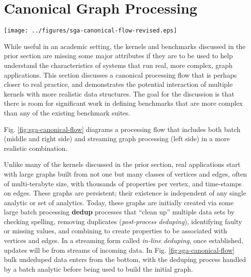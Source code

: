 \section{Canonical Graph Processing}\label{sec:sga-canonical}

\begin{figure*}\begin{centering}
\texttt{[image: ../figures/sga-canonical-flow-revised.eps]}
\caption{A Canonical Graph Processing Flow.}
\label{fig:sga-canonical-flow}
\end{centering}\end{figure*}

While useful in an academic setting, the kernels and benchmarks discussed in the prior section are missing some major attributes if they are to be used to help understand the characteristics of systems that run real, more complex, graph applications. This section discusses a canonical processing flow that is perhaps closer to real practice, and demonstrates the potential interaction of multiple kernels with more realistic data structures. The goal for the discussion is that there is room for significant work in defining benchmarks that are more complex than any of the existing benchmark suites.

Fig. \ref{fig:sga-canonical-flow} diagrams a processing flow that includes both batch (middle and right side) and streaming graph processing (left side) in a more realistic combination.

Unlike many of the kernels discussed in the prior section, real applications start with large graphs built from not one but many classes of vertices and edges, often of multi-terabyte size, with thousands of properties per vertex, and time-stamps on edges. These graphs are persistent; their existence is independent of any single analytic or set of analytics. Today, these graphs are initially created via some large batch processing \textbf{dedup} processes \cite{big-data:dedup:5887335,big-data:dedup:4016511} that ``clean up'' multiple data sets by checking spelling, removing duplicates (\emph{post-process deduping}), identifying faulty or missing values, and combining to create properties to be associated with vertices and edges. In a streaming form called \emph{in-line deduping}, once established, updates will be from streams of incoming data. In Fig. \ref{fig:sga-canonical-flow} bulk undeduped data enters from the bottom, with the deduping process handled by a batch analytic before being used to build the initial graph.

